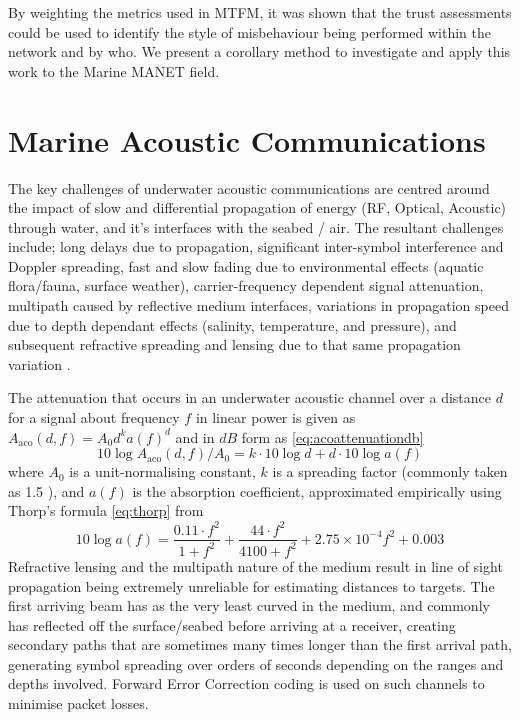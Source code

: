 \documentclass[conference]{IEEEtran}
\begin{document}
By weighting the metrics used in MTFM, it was shown that the trust assessments could be used to identify the style of misbehaviour being performed within the network and by who.
We present a corollary method to investigate and apply this work to the Marine MANET field.


\section{Marine Acoustic Communications}\label{sec:marineacousticnetworks}

The key challenges of underwater acoustic communications are centred around the impact of slow and differential propagation of energy (RF, Optical, Acoustic) through water, and it's interfaces with the seabed / air.
The resultant challenges include; long delays due to propagation, significant inter-symbol interference and Doppler spreading, fast and slow fading due to environmental effects (aquatic flora/fauna, surface weather), carrier-frequency dependent signal attenuation, multipath caused by reflective medium interfaces, variations in propagation speed due to depth dependant effects (salinity, temperature, and pressure), and subsequent refractive spreading and lensing due to that same propagation variation \cite{Partan2006}.

The attenuation that occurs in an underwater acoustic channel over a distance $d$ for a signal about frequency $f$ in linear power is given as $A_{\text{aco}}(d,f) = A_0d^ka(f)^d$ and in $dB$ form as \eqref{eq:acoattenuationdb} 
%
\begin{equation}
  \label{eq:acoattenuationdb}
  10 \log A_{\text{aco}}(d,f)/A_0 = k \cdot 10 \log d + d \cdot 10 \log a(f)
\end{equation}
%
where $A_0$ is a unit-normalising constant, $k$ is a spreading factor (commonly taken as 1.5  \cite{Stojanovic2007}), and $a(f)$ is the absorption coefficient, approximated empirically using Thorp's formula \eqref{eq:thorp} from \cite{Brekhovskikh1991}
%
\begin{equation}
  \label{eq:thorp}
  10 \log a(f) = \frac{0.11 \cdot f^2}{1+f^2} + \frac{44\cdot f^2}{4100+f^2}+ 2.75\times10^{-4} f^2 + 0.003
\end{equation}
%
Refractive lensing and the multipath nature of the medium result in line of sight propagation being extremely unreliable for estimating distances to targets.
The first arriving beam has as the very least curved in the medium, and commonly has reflected off the surface/seabed before arriving at a receiver, creating secondary paths that are sometimes many times longer than the first arrival path, generating symbol spreading over orders of seconds depending on the ranges and depths involved.
Forward Error Correction coding is used on such channels to minimise packet losses.
\end{document}
